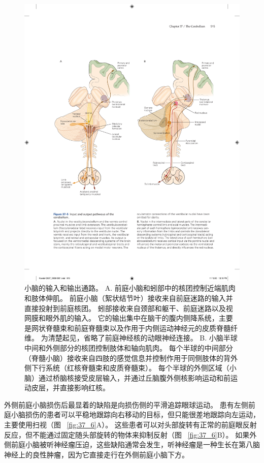 \begin{figure}[htbp]
	\centering
	\includegraphics[width=0.9\linewidth]{chap37/fig_37_5}
	\caption{小脑的输入和输出通路。 A. 前庭小脑和蚓部中的核团控制近端肌肉和肢体伸肌。 前庭小脑（絮状结节叶）接收来自前庭迷路的输入并直接投射到前庭核团。 蚓部接收来自颈部和躯干、前庭迷路以及视网膜和眼外肌的输入。 它的输出集中在脑干的腹内侧降系统，主要是网状脊髓束和前庭脊髓束以及作用于内侧运动神经元的皮质脊髓纤维。 为清楚起见，省略了前庭神经核的动眼神经连接。 B. 小脑半球中间和外侧部分的核团控制肢体和轴向肌肉。 每个半球的中间部分（脊髓小脑）接收来自四肢的感觉信息并控制作用于同侧肢体的背外侧下行系统（红核脊髓束和皮质脊髓束）。 每个半球的外侧区域（小脑）通过桥脑核接受皮层输入，并通过丘脑腹外侧核影响运动和前运动皮层，并直接影响红核。}
	\label{fig:37_5}
\end{figure}


外侧前庭小脑损伤后最显着的缺陷是向损伤侧的平滑追踪眼球运动。
患有左侧前庭小脑损伤的患者可以平稳地跟踪向右移动的目标，但只能很差地跟踪向左运动，主要使用扫视（图 ~\ref{fig:37_6}A）。
这些患者可以对头部旋转有正常的前庭眼反射反应，但不能通过固定随头部旋转的物体来抑制反射（图 ~\ref{fig:37_6}B）。
如果外侧前庭小脑被听神经瘤压迫，这些缺陷通常会发生，听神经瘤是一种生长在第八脑神经上的良性肿瘤，因为它直接走行在外侧前庭小脑下方。


